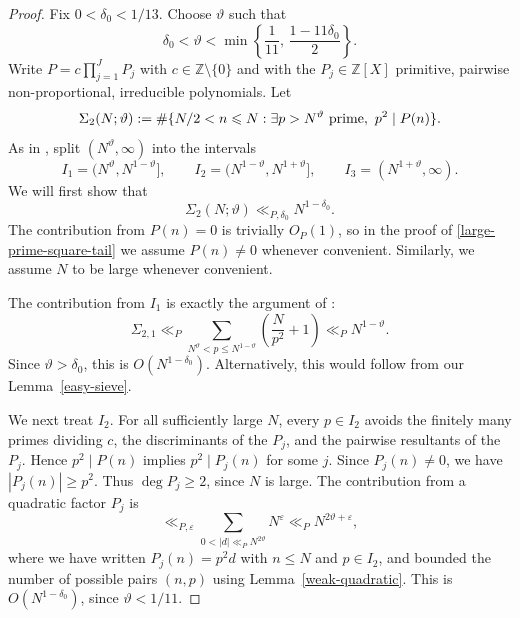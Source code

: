 \documentclass[reqno, 12pt]{amsart}
\theoremstyle{plain}
\theoremstyle{definition}
\theoremstyle{remark}
\renewcommand{\le}{\leqslant}
\renewcommand{\ge}{\geqslant}
\renewcommand{\leq}{\leqslant}
\begin{document}
\begin{proof}
Fix \(0<\delta_0<1/13\). Choose \(\vartheta\) such that
\[
  \delta_0<\vartheta<\min\left\{\frac1{11},\,\frac{1-11\delta_0}{2}\right\}.
\]
Write
$P=c\prod_{j=1}^J P_j$
with \(c\in\mathbb Z\setminus\{0\}\) and with the \(P_j\in\mathbb Z[X]\)
primitive, pairwise non-proportional, irreducible polynomials. Let
\[
 \Sigma_2(N;\vartheta)
 :=
 \#\{N/2<n\leq N:\exists p>N^\vartheta\ {\rm prime},\ p^2\mid P(n)\}.
\]
As in \cite[\S4]{BookerBrowning}, split $(N^\vartheta,\infty)$ into the intervals
\[
I_1=(N^\vartheta,N^{1-\vartheta}],\qquad
I_2=(N^{1-\vartheta},N^{1+\vartheta}],\qquad
I_3=(N^{1+\vartheta},\infty).
\]
We will first show that
\begin{equation}
\label{large-prime-square-tail}
 \Sigma_2(N;\vartheta)\ll_{P,\delta_0}N^{1-\delta_0}.
\end{equation}
The contribution from $P(n)=0$ is trivially $O_P(1)$,
so in the proof of \eqref{large-prime-square-tail} we assume $P(n)\ne 0$ whenever convenient.
Similarly, we assume $N$ to be large whenever convenient.

The contribution from \(I_1\) is exactly the argument of
\cite[Lemma~4.1]{BookerBrowning}:
\[
 \Sigma_{2,1}\ll_P
 \sum_{N^\vartheta<p\leq N^{1-\vartheta}}
 \left(\frac{N}{p^2}+1\right)
 \ll_P N^{1-\vartheta}.
\]
Since \(\vartheta>\delta_0\), this is \(O(N^{1-\delta_0})\).
Alternatively, this would follow from our Lemma~\ref{easy-sieve}.

We next treat \(I_2\). For all sufficiently large \(N\), every
\(p\in I_2\) avoids the finitely many primes dividing \(c\), the discriminants
of the \(P_j\), and the pairwise resultants of the \(P_j\).
Hence \(p^2\mid P(n)\)
implies \(p^2\mid P_j(n)\) for some \(j\).
Since $P_j(n)\ne 0$, we have $|P_j(n)| \ge p^2$.
Thus $\deg{P_j}\ge 2$, since $N$ is large.
The contribution from a quadratic factor $P_j$ is
\begin{equation*}
\ll_{P,\varepsilon} \sum_{0<|d|\ll_P N^{2\vartheta}} N^\varepsilon
\ll_P N^{2\vartheta+\varepsilon},
\end{equation*}
where we have written $P_j(n) = p^2 d$ with $n\le N$ and $p\in I_2$,
and bounded the number of possible pairs $(n,p)$ using Lemma~\ref{weak-quadratic}.
This is \(O(N^{1-\delta_0})\), since \(\vartheta<1/11\).


\end{proof}
\end{document}
